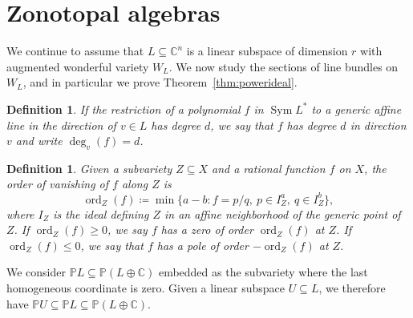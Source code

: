 \documentclass{amsart}
\newtheorem{definition}[theorem]{Definition}
\newcommand{\Sym}{\operatorname{Sym}}
\newcommand{\F}{\mathbb{C}}
\newcommand{\C}{\mathbb{C}}
\renewcommand{\P}{\mathbb{P}}
\newcommand{\ord}{\operatorname{ord}}
\theoremstyle{definition}
\begin{document}
\section{Zonotopal algebras}
We continue to assume that $L \subseteq \F^n$ is a linear subspace of dimension $r$ with 
augmented wonderful variety $W_L$. We now study the sections of line bundles on $W_L$, and in particular we prove Theorem~\ref{thm:powerideal}. 

\begin{definition}
If the restriction of a polynomial $f$ in $\Sym L^*$ to a generic affine line in the direction of $v \in L$ has degree $d$, we say that $f $ has degree $d$ in direction $v$ and write $\deg_v(f) = d$. 
\end{definition}

\begin{definition}
Given a subvariety $Z \subseteq X$ and a rational 
function $f$ on $X$, the order of vanishing of $f$ along $Z$ is
\[
    \ord_Z(f) \coloneqq \min \{ a-b : f=p/q,\ p \in I_Z^a,\ q 
    \in I_Z^b\},
\]
where $I_Z$ is the ideal defining $Z$ in an affine neighborhood of the 
generic point of $Z$. If $\ord_Z(f) \geq 0$, we say $f$ has a zero of order 
$\ord_Z(f)$ at $Z$. If $\ord_Z(f) \leq 0$, we say that $f$ 
has a pole of order $-\ord_Z(f)$ at $Z$.
\end{definition}

We consider $\P L \subseteq \P(L \oplus \C)$ embedded as the subvariety 
where the last homogeneous coordinate is zero. Given a linear subspace 
$U \subseteq L$, we therefore have $\P U \subseteq \P L \subseteq \P(L \oplus \C)$.
\end{document}
